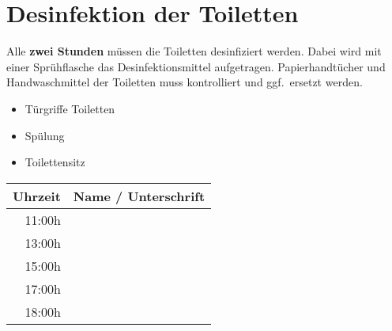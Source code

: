\documentclass[10pt,a4paper]{scrartcl}
\begin{document}
\section{Desinfektion der Toiletten}
Alle \textbf{zwei Stunden} müssen die Toiletten desinfiziert werden.
Dabei wird mit einer Sprühflasche das Desinfektionsmittel aufgetragen.
Papierhandtücher und Handwaschmittel der Toiletten muss kontrolliert und ggf.\ ersetzt werden.
\begin{itemize}
\item Türgriffe Toiletten
\item Spülung
\item Toilettensitz
\end{itemize}

\begin{tabular}{ | r | p{15cm} |}
\hline
\textbf{Uhrzeit} & \textbf{Name / Unterschrift} \\ \hline
11:00h & \\ \hline
13:00h & \\ \hline
15:00h & \\ \hline
17:00h & \\ \hline
18:00h & \\ \hline
\end{tabular}
\end{document}
